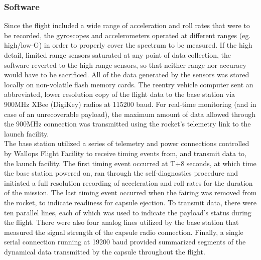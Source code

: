 \documentclass{article}
\begin{document}
\begin{doublespace}
		\subsubsection{Software} 
		\indent\indent Since the flight included a wide range of acceleration and roll rates that were to be recorded, the gyroscopes and accelerometers operated at different ranges (eg. high/low-G) in order to properly cover the spectrum to be measured. If the high detail, limited range sensors saturated at any point of data collection, the software reverted to the high range sensors, so that neither range nor accuracy would have to be sacrificed. All of the data generated by the sensors was stored locally on non-volatile flash memory cards. The reentry vehicle computer sent an abbreviated, lower resolution copy of the flight data to the base station via 900MHz XBee (DigiKey) radios at 115200 baud. For real-time monitoring (and in case of an unrecoverable payload), the maximum amount of data allowed through the 900MHz connection was transmitted using the rocket's telemetry link to the launch facility.\\
		\indent The base station utilized a series of telemetry and power connections controlled by Wallops Flight Facility to receive timing events from, and transmit data to, the launch facility. The first timing event occurred at T+8 seconds, at which time the base station powered on, ran through the self-diagnostics procedure and initiated a full resolution recording of acceleration and roll rates for the duration of the mission. The last timing event occurred when the fairing was removed from the rocket, to indicate readiness for capsule ejection. 
To transmit data, there were ten parallel lines, each of which was used to indicate the payload's status during the flight. There were also four analog lines utilized by the base station that measured the signal strength of the capsule radio connection. Finally, a single serial connection running at 19200 baud provided summarized segments of the dynamical data transmitted by the capsule throughout the flight. 
	\end{doublespace}
		

\end{document}
